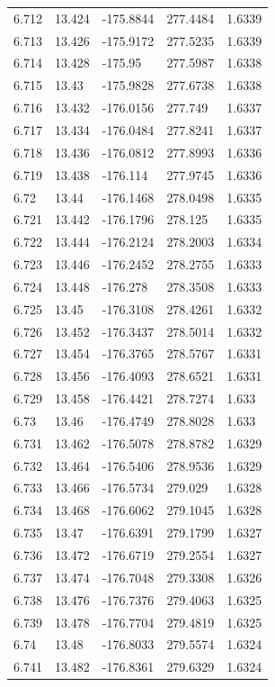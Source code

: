 \begin{tabular}{lllll}
6.712 & 13.424 & -175.8844 & 277.4484 & 1.6339 \\
6.713 & 13.426 & -175.9172 & 277.5235 & 1.6339 \\
6.714 & 13.428 & -175.95 & 277.5987 & 1.6338 \\
6.715 & 13.43 & -175.9828 & 277.6738 & 1.6338 \\
6.716 & 13.432 & -176.0156 & 277.749 & 1.6337 \\
6.717 & 13.434 & -176.0484 & 277.8241 & 1.6337 \\
6.718 & 13.436 & -176.0812 & 277.8993 & 1.6336 \\
6.719 & 13.438 & -176.114 & 277.9745 & 1.6336 \\
6.72 & 13.44 & -176.1468 & 278.0498 & 1.6335 \\
6.721 & 13.442 & -176.1796 & 278.125 & 1.6335 \\
6.722 & 13.444 & -176.2124 & 278.2003 & 1.6334 \\
6.723 & 13.446 & -176.2452 & 278.2755 & 1.6333 \\
6.724 & 13.448 & -176.278 & 278.3508 & 1.6333 \\
6.725 & 13.45 & -176.3108 & 278.4261 & 1.6332 \\
6.726 & 13.452 & -176.3437 & 278.5014 & 1.6332 \\
6.727 & 13.454 & -176.3765 & 278.5767 & 1.6331 \\
6.728 & 13.456 & -176.4093 & 278.6521 & 1.6331 \\
6.729 & 13.458 & -176.4421 & 278.7274 & 1.633 \\
6.73 & 13.46 & -176.4749 & 278.8028 & 1.633 \\
6.731 & 13.462 & -176.5078 & 278.8782 & 1.6329 \\
6.732 & 13.464 & -176.5406 & 278.9536 & 1.6329 \\
6.733 & 13.466 & -176.5734 & 279.029 & 1.6328 \\
6.734 & 13.468 & -176.6062 & 279.1045 & 1.6328 \\
6.735 & 13.47 & -176.6391 & 279.1799 & 1.6327 \\
6.736 & 13.472 & -176.6719 & 279.2554 & 1.6327 \\
6.737 & 13.474 & -176.7048 & 279.3308 & 1.6326 \\
6.738 & 13.476 & -176.7376 & 279.4063 & 1.6325 \\
6.739 & 13.478 & -176.7704 & 279.4819 & 1.6325 \\
6.74 & 13.48 & -176.8033 & 279.5574 & 1.6324 \\
6.741 & 13.482 & -176.8361 & 279.6329 & 1.6324 \\

\end{tabular}
